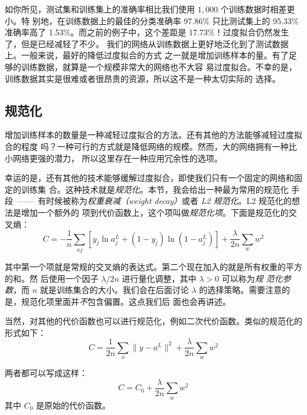 如你所见，测试集和训练集上的准确率相比我们使用 $1,000$ 个训练数据时相差更小。特
别地，在训练数据上的最佳的分类准确率 97.86\% 只比测试集上的 95.33\% 准确率高了
1.53\%。而之前的例子中，这个差距是 17.73\%！过度拟合仍然发生了，但是已经减轻了不少。
我们的网络从训练数据上更好地泛化到了测试数据上。一般来说，最好的降低过度拟合的方式
之一就是增加训练样本的量。有了足够的训练数据，就算是一个规模非常大的网络也不大容
易过度拟合。不幸的是，训练数据其实是很难或者很昂贵的资源，所以这不是一种太切实际的
选择。

\subsection{规范化}

增加训练样本的数量是一种减轻过度拟合的方法。还有其他的方法能够减轻过度拟合的程度
吗？一种可行的方式就是降低网络的规模。然而，大的网络拥有一种比小网络更强的潜力，
所以这里存在一种应用冗余性的选项。

幸运的是，还有其他的技术能够缓解过度拟合，即使我们只有一个固定的网络和固定的训练集
合。这种技术就是\emph{规范化}。本节，我会给出一种最为常用的规范化
手段~——~有时候被称为\emph{权重衰减（weight decay）}或者 \emph{L2 规范化}。L2 规范化的想法是增加一个额外的
项到代价函数上，这个项叫做\emph{规范化项}。下面是规范化的交叉熵：
\begin{equation}
  C = -\frac{1}{n} \sum_{xj} \left[ y_j \ln a^L_j+(1-y_j) \ln
  (1-a^L_j)\right] + \frac{\lambda}{2n} \sum_w w^2
\label{eq:85}\tag{85}
\end{equation}

其中第一个项就是常规的交叉熵的表达式。第二个现在加入的就是所有权重的平方的和。然
后使用一个因子 $\lambda / 2n$ 进行量化调整，其中 $\lambda > 0$ 可以称为\emph{规
  范化参数}，而 $n$ 就是训练集合的大小。我们会在后面讨论
$\lambda$ 的选择策略。需要注意的是，规范化项里面并\emph{不}包含偏置。这点我们后
面也会再讲述。

当然，对其他的代价函数也可以进行规范化，例如二次代价函数。类似的规范化的形式如下：
\begin{equation}
  C = \frac{1}{2n} \sum_x \|y-a^L\|^2 + \frac{\lambda}{2n} \sum_w w^2
  \label{eq:86}\tag{86}
\end{equation}

两者都可以写成这样：
\begin{equation}
  C = C_0 + \frac{\lambda}{2n} \sum_w w^2
  \label{eq:87}\tag{87}
\end{equation}
其中 $C_0$ 是原始的代价函数。

